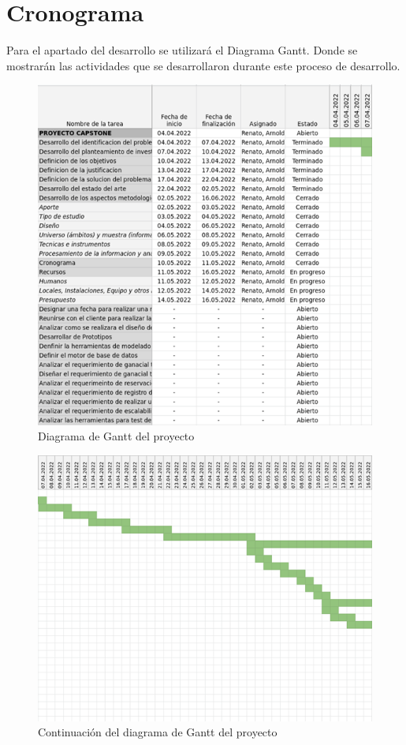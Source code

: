 \documentclass[12pt,a4paper,oneside]{article}
\begin{document}
\section{Cronograma}
Para el apartado del desarrollo se utilizará el Diagrama Gantt. Donde se mostrarán las actividades que se desarrollaron durante este proceso de desarrollo. 
\begin{figure}[H]
    \centering
    \includegraphics[width=15cm]{Recursos/d.PNG}
    \caption{Diagrama de Gantt del proyecto}
    \label{fig:projectGantt}
\end{figure}
\begin{figure}[H]
    \centering
    \includegraphics[width=15cm]{Recursos/e.PNG}
    \caption{Continuación del diagrama de Gantt del proyecto }
    \label{fig:projectGantt2}
\end{figure}
\end{document}
